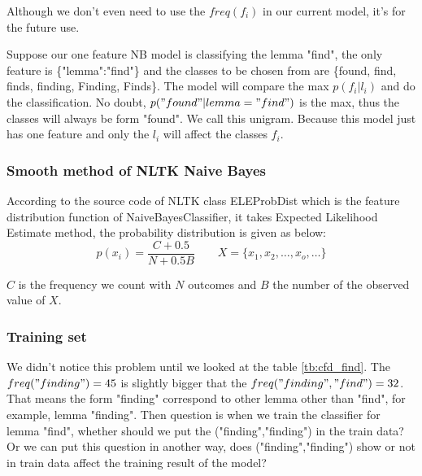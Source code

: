 \documentclass[a4paper]{article}
\begin{document}
Although we don't even need to use the $freq(f_i)$ in our current model, it's for the future use.

Suppose our one feature NB model is classifying the lemma "find", the only feature is \{"lemma":"find"\} and the classes to be chosen from are \{found, find, finds, finding, Finding, Finds\}. The model will compare the max $p(f_i|l_i)$ and do the classification. No doubt, $p("found" | lemma="find")$ is the max, thus the classes will always be form "found". We call this unigram. Because this model just has one feature and only the $l_i$ will affect the classes $f_i$. 

\subsubsection{Smooth method of NLTK Naive Bayes}

According to the source code of NLTK class ELEProbDist which is the feature distribution function of NaiveBayesClassifier, it takes Expected Likelihood Estimate method, the probability distribution is given as below:\cite{loper_nltk.probability_nodate}
\begin{equation}
p(x_i)=\frac{C+0.5}{N+0.5B} \qquad X = \{x_1,x_2,\dots,x_o,\dots\}
\end{equation}

$C$ is the frequency we count with $N$ outcomes and $B$ the number of the observed value of $X$. 




\subsubsection{Training set}

We didn't notice this problem until we looked at the table \ref{tb:cfd_find}. The $freq("finding")=45$ is slightly bigger that the $freq("finding","find")=32$. That means the form "finding" correspond to other lemma other than "find", for example, lemma "finding". Then question is when we train the classifier for lemma "find", whether should we put the ("finding","finding") in the train data? Or we can put this question in another way, does ("finding","finding") show or not in train data affect the training result of the model?
\end{document}
